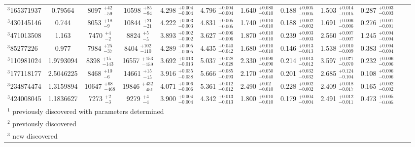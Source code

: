 \begin{table}[htbp]
\begin{tabular}{lccccccccccc}
$^{3}$165371937 & 0.79564 & 8097  $_{- 59  }^{+ 42  }$& 10598  $_{- 84  }^{+ 85  }$& 4.298 $_{- 0.004 }^{+ 0.004 }$& 4.796 $_{- 0.004 }^{+ 0.004 }$& 1.640 $_{- 0.010 }^{+ 0.080 }$& 0.188 $_{- 0.005 }^{+ 0.005 }$& 1.503 $_{- 0.015 }^{+ 0.014 }$& 0.287 $_{- 0.003 }^{+ 0.003 }$\\
$^{3}$430145146 & 0.744 & 8053  $_{- 9  }^{+ 18  }$& 10844  $_{- 21  }^{+ 21  }$& 4.222 $_{- 0.003 }^{+ 0.003 }$& 4.831 $_{- 0.005 }^{+ 0.005 }$& 1.740 $_{- 0.010 }^{+ 0.010 }$& 0.188 $_{- 0.002 }^{+ 0.002 }$& 1.691 $_{- 0.006 }^{+ 0.006 }$& 0.276 $_{- 0.001 }^{+ 0.001 }$\\
$^{3}$471013508 & 1.163 & 7470  $_{- 2  }^{+ 4  }$& 8824  $_{- 5  }^{+ 5  }$& 3.893 $_{- 0.002 }^{+ 0.002 }$& 3.627 $_{- 0.006 }^{+ 0.006 }$& 1.870 $_{- 0.010 }^{+ 0.010 }$& 0.239 $_{- 0.003 }^{+ 0.003 }$& 2.560 $_{- 0.007 }^{+ 0.007 }$& 1.245 $_{- 0.004 }^{+ 0.004 }$\\
$^{3}$85277226 & 0.977 & 7984  $_{- 37  }^{+ 25  }$& 8404  $_{- 110  }^{+ 102  }$& 4.289 $_{- 0.005 }^{+ 0.005 }$& 4.435 $_{- 0.042 }^{+ 0.040 }$& 1.680 $_{- 0.010 }^{+ 0.010 }$& 0.146 $_{- 0.013 }^{+ 0.013 }$& 1.538 $_{- 0.009 }^{+ 0.010 }$& 0.383 $_{- 0.004 }^{+ 0.004 }$\\
$^{3}$110981024 & 1.9793094 & 8398  $_{- 143  }^{+ 15  }$& 16557  $_{- 159  }^{+ 153  }$& 3.692 $_{- 0.013 }^{+ 0.013 }$& 5.037 $_{- 0.028 }^{+ 0.028 }$& 2.330 $_{- 0.090 }^{+ 0.090 }$& 0.214 $_{- 0.012 }^{+ 0.013 }$& 3.597 $_{- 0.070 }^{+ 0.071 }$& 0.232 $_{- 0.006 }^{+ 0.006 }$\\
$^{3}$177118177 & 2.5046225 & 8468  $_{- 6  }^{+ 10  }$& 14661  $_{- 15  }^{+ 15  }$& 3.916 $_{- 0.038 }^{+ 0.035 }$& 5.666 $_{- 0.093 }^{+ 0.085 }$& 2.170 $_{- 0.040 }^{+ 0.050 }$& 0.201 $_{- 0.032 }^{+ 0.032 }$& 2.685 $_{- 0.104 }^{+ 0.124 }$& 0.108 $_{- 0.006 }^{+ 0.006 }$\\
$^{3}$234874474 & 1.3159894 & 10647  $_{- 468  }^{+ 68  }$& 19846  $_{- 451  }^{+ 432  }$& 4.071 $_{- 0.006 }^{+ 0.006 }$& 5.361 $_{- 0.012 }^{+ 0.012 }$& 2.490 $_{- 0.010 }^{+ 0.02 }$& 0.228 $_{- 0.002 }^{+ 0.002 }$& 2.409 $_{- 0.017 }^{+ 0.018 }$& 0.165 $_{- 0.002 }^{+ 0.002 }$\\
$^{3}$424008045 & 1.1836627 & 7273  $_{- 3  }^{+ 2  }$& 9279  $_{- 4  }^{+ 4  }$& 3.900 $_{- 0.004 }^{+ 0.004 }$& 4.342 $_{- 0.013 }^{+ 0.013 }$& 1.800 $_{- 0.010}^{+ 0.010 }$& 0.179 $_{- 0.004 }^{+ 0.004 }$& 2.491 $_{- 0.011 }^{+ 0.012 }$& 0.473 $_{- 0.005 }^{+ 0.005 }$\\
\hline
\multicolumn{5}{l}{\footnotesize $^{1}$ previously discovered with parameters determined}\\
\multicolumn{5}{l}{\footnotesize $^{2}$ previously discovered}\\
\multicolumn{5}{l}{\footnotesize $^{3}$ new discovered}\\
\end{tabular}
\end{table}

